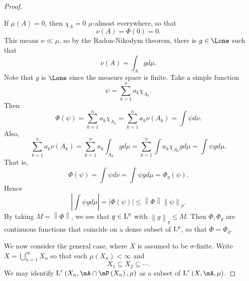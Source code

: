 \documentclass[pmath451]{subfiles}
\begin{document}
\begin{proof}
\begin{case}
            If $\mu\left( A \right) = 0$, then $\chi_A = 0$ $\mu$-almost everywhere, so that
            \begin{equation*}
                \nu\left( A \right) = \Phi\left( 0 \right) = 0.
            \end{equation*}
            This means $\nu\ll\mu$, so by the Radon-Nikodym theorem, there is $g\in\Lone$ such that
            \begin{equation*}
                \nu\left( A \right) = \int_Agd\mu.
            \end{equation*}
            Note that $g$ is $\Lone$ since the measure space is finite. Take a simple function
            \begin{equation*}
                \psi = \sum^{n}_{k=1} a_k\chi_{A_k}.
            \end{equation*}
            Then
            \begin{equation*}
                \Phi\left( \psi \right) = \sum^{n}_{k=1}a_k\chi_{A_k} = \sum^{n}_{k=1} a_k\nu\left( A_k \right) = \int\psi d\nu.
            \end{equation*}
            Also,
            \begin{equation*}
                \sum^{n}_{k=1} a_k\nu\left( A_k \right) = \sum^{n}_{k=1} a_k \int_{A_k}gd\mu = \sum^{n}_{k=1} \int a_k\chi_{A_k}gd\mu = \int\psi gd\mu.
            \end{equation*}
            That is,
            \begin{equation*}
                \Phi\left( \psi \right) = \int\psi d\nu = \int\psi gd\mu = \Phi_g\left( \psi \right).
            \end{equation*}
            Hence
            \begin{equation*}
                \left| \int\psi gd\mu \right| = \left| \Phi\left( \psi \right) \right| \leq \left\lVert \Phi\right\rVert\left\lVert \psi\right\rVert_p.
            \end{equation*}
            By taking $M = \left\lVert \Phi\right\rVert$, we see that $g\in\operatorname{L}^q$ with $\left\lVert g\right\rVert_q\leq M$. Then $\Phi,\Phi_g$ are continuous functions that coincide on a dense subset of $\operatorname{L}^p$, so that $\Phi=\Phi_g$.
        \end{case}

        \clearpage

        We now consider the general case, where $X$ is assumed to be $\sigma$-finite. Write $X = \bigcup^{\infty}_{n=1}X_n$ so that each $\mu\left( X_n \right)<\infty$ and
        \begin{equation*}
            X_1\subseteq X_2\subseteq\cdots.
        \end{equation*}
        We may identify $\LLL^r\left( X_n,\mA\cap\mP\left( X_n \right),\mu \right)$ as a subset of $\LLL^r\left( X,\mA,\mu \right)$.


\end{proof}
\end{document}
